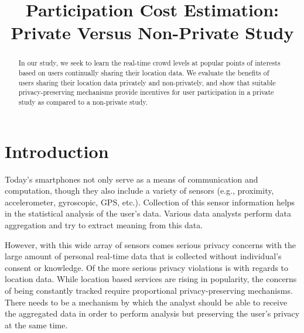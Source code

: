 \documentclass[conference]{IEEEtran}
\begin{document}
\title{Participation Cost Estimation: Private Versus Non-Private Study}


\author{
}











\maketitle


\IEEEpeerreviewmaketitle

\begin{abstract}

In our study, we seek to learn the real-time crowd levels at popular points of interests based on users continually sharing their location data. We evaluate the benefits of users sharing their location data privately and non-privately, and show that suitable privacy-preserving mechanisms provide incentives for user participation in a private study as compared to a non-private study.

\end{abstract} \section{Introduction}


Today's smartphones not only serve as a means of communication and computation, though they also include a variety of sensors (e.g., proximity, accelerometer, gyroscopic, GPS, etc.).  Collection of this sensor information helps in the statistical analysis of the user's data. Various data analysts perform data aggregation and try to extract meaning from this data.

However, with this wide array of sensors comes serious privacy concerns with the large amount of personal real-time data that is collected without individual's consent or knowledge. Of the more serious privacy violations is with regards to location data. While location based services are rising in popularity, the concerns of being constantly tracked require proportional privacy-preserving mechanisms. There needs to be a mechanism by which the analyst should be able to receive the aggregated data in order to perform analysis but preserving the user's privacy at the same time. 
\end{document}

